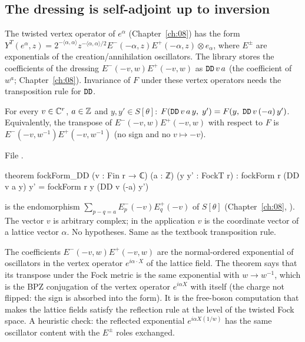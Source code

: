 \subsection{The dressing is self-adjoint up to inversion}

The twisted vertex operator of $e^\alpha$ (Chapter~\ref{ch:08}) has the form
$Y^T(e^\alpha,z)=2^{-\langle\alpha,\alpha\rangle}z^{-\langle\alpha,\alpha\rangle/2}E^-(-\alpha,z)E^+(-\alpha,z)\otimes e_\alpha$,
where $E^\pm$ are exponentials of the creation/annihilation oscillators. The library stores the
coefficients of the dressing $E^-(-v,w)E^+(-v,w)$ as $\lean{DD}\,v\,a$ (the coefficient of
$w^a$; Chapter~\ref{ch:08}). Invariance of $F$ under these vertex operators needs the
transposition rule for $\lean{DD}$.

\begin{theorem}\label{ch09:thm:DD}
For every $v\in{\mathbb{C}}^r$, $a\in{\mathbb{Z}}$ and $y,y'\in S[\theta]$:
$F(\lean{DD}\,v\,a\,y,\;y')=F(y,\;\lean{DD}\,v\,(-a)\,y')$. Equivalently, the transpose of
$E^-(-v,w)E^+(-v,w)$ with respect to $F$ is $E^-(-v,w^{-1})E^+(-v,w^{-1})$ (no sign and no
$v\mapsto-v$).
\end{theorem}
\noindent File .
\begin{leancode}
theorem fockForm_DD (v : Fin r → ℂ) (a : ℤ) (y y' : FockT r) :
    fockForm r (DD v a y) y' = fockForm r y (DD v (-a) y')
\end{leancode}
\begin{dictionary}
 is the endomorphism $\sum_{p-q=a}E^-_p(-v)E^+_q(-v)$ of $S[\theta]$ (Chapter~\ref{ch:08},
). The vector $v$ is
arbitrary complex; in the application $v$ is the coordinate vector of a lattice vector $\alpha$.
No hypotheses. Same as the textbook transposition rule.
\end{dictionary}
\begin{physics}
The coefficients $E^-(-v,w)E^+(-v,w)$ are the normal-ordered exponential of oscillators in the vertex operator $e^{i\alpha\cdot X}$ of the lattice field. The theorem says that its transpose under the Fock metric is the same exponential with $w\to w^{-1}$, which is the BPZ conjugation of the vertex operator $e^{i\alpha X}$ with itself (the charge not flipped: the sign is absorbed into the form). It is the free-boson computation that makes the lattice fields satisfy the reflection rule at the level of the twisted Fock space. A heuristic check: the reflected exponential $e^{i\alpha X(1/w)}$ has the same oscillator content with the $E^\pm$ roles exchanged.
\end{physics}

